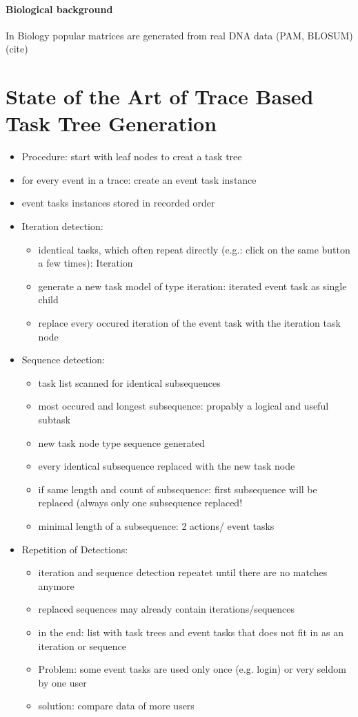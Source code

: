 	\paragraph{Biological background}
	In Biology popular matrices are generated from real DNA data (PAM, BLOSUM) (cite)


\section{State of the Art of Trace Based Task Tree Generation}
\begin{itemize}
	\item Procedure: start with leaf nodes to creat a task tree
 	\item for every event in a trace: create an event task instance
  	\item event tasks instances stored in recorded order

	\item Iteration detection:
	\begin{itemize} 
		\item identical tasks, which often repeat directly (e.g.: click on the same button a few times): Iteration
		\item generate a new task model of type iteration: iterated event task as single child
		\item replace every occured iteration of the event task with the iteration task node 
	\end{itemize}

	\item Sequence detection:
	\begin{itemize}
		\item task list scanned for identical subsequences
    		\item most occured and longest subsequence: propably a logical and useful subtask
		\item new task node type sequence generated
		\item every identical subsequence replaced with the new task node 
		\item if same length and count of subsequence: first subsequence will be replaced (always only one subsequence replaced!
    		\item minimal length of a subsequence: 2 actions/ event tasks
	\end{itemize}
	\item Repetition of Detections:
	\begin{itemize}
		\item iteration and sequence detection repeatet until there are no matches anymore
  		\item replaced sequences may already contain iterations/sequences 
		\item in the end: list with task trees and event tasks that does not fit in as an iteration or sequence
		\item Problem: some event tasks are used only once (e.g. login) or very seldom by one user
		\item solution: compare data of more users 
	\end{itemize}
\end{itemize}
